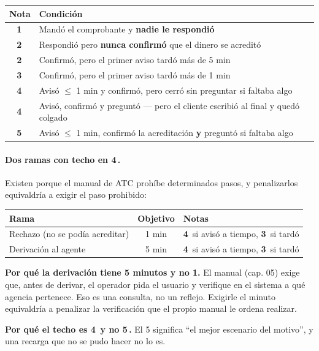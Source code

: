 \documentclass[11pt,a4paper]{article}
\newcommand{\est}[1]{\textbf{#1}\,\raisebox{0.5pt}{$\star$}}
\begin{document}
\begin{center}
\begin{tabularx}{\textwidth}{@{}cX@{}}
\toprule
\textbf{Nota} & \textbf{Condición} \\
\midrule
\est{1} & Mandó el comprobante y \textbf{nadie le respondió} \\
\est{2} & Respondió pero \textbf{nunca confirmó} que el dinero se acreditó \\
\est{2} & Confirmó, pero el primer aviso tardó más de 5 min \\
\est{3} & Confirmó, pero el primer aviso tardó más de 1 min \\
\est{4} & Avisó $\le$ 1 min y confirmó, pero cerró sin preguntar si faltaba algo \\
\est{4} & Avisó, confirmó y preguntó --- pero el cliente escribió al final y quedó colgado \\
\est{5} & Avisó $\le$ 1 min, confirmó la acreditación \textbf{y} preguntó si faltaba algo \\
\bottomrule
\end{tabularx}
\end{center}

\paragraph{Dos ramas con techo en \est{4}.} Existen porque el manual de ATC prohíbe
determinados pasos, y penalizarlos equivaldría a exigir el paso prohibido:

\begin{center}
\begin{tabularx}{\textwidth}{@{}lcX@{}}
\toprule
\textbf{Rama} & \textbf{Objetivo} & \textbf{Notas} \\
\midrule
Rechazo (no se podía acreditar) & 1 min & \est{4} si avisó a tiempo, \est{3} si tardó \\
Derivación al agente & 5 min & \est{4} si avisó a tiempo, \est{3} si tardó \\
\bottomrule
\end{tabularx}
\end{center}

\begin{nota}
\textbf{Por qué la derivación tiene 5 minutos y no 1.} El manual (cap. 05) exige que,
antes de derivar, el operador pida el usuario y verifique en el sistema a qué agencia
pertenece. Eso es una consulta, no un reflejo. Exigirle el minuto equivaldría a penalizar la
verificación que el propio manual le ordena realizar.

\textbf{Por qué el techo es \est{4} y no \est{5}.} El 5 significa ``el mejor escenario
del motivo'', y una recarga que no se pudo hacer no lo es.
\end{nota}
\end{document}
